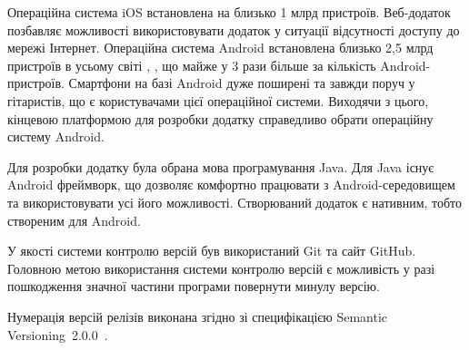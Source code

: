 Операційна система iOS встановлена на близько 1 млрд пристроїв. Веб-додаток позбавляє можливості використовувати додаток у ситуації відсутності доступу до мережі Інтернет. Операційна система Android встановлена близько 2,5 млрд пристроїв в усьому світі \cite{androiddevelopers}, , що майже у 3 рази більше за кількість Android-пристроїв. Смартфони на базі Android дуже поширені та завжди поруч у гітаристів, що є користувачами цієї операційної системи. Виходячи з цього, кінцевою платформою для розробки додатку справедливо обрати операційну систему Android.

Для розробки додатку була обрана мова програмування Java. Для Java існує Android фреймворк, що дозволяє комфортно працювати з Android-середовищем та використовувати усі його можливості. Створюваний додаток є нативним, тобто створеним для Android. 

У якості системи контролю версій був використаний Git та сайт GitHub. Головною метою використання системи контролю версій є можливість у разі пошкодження значної частини програми повернути минулу версію.

Нумерація версій релізів виконана згідно зі специфікацією Semantic Versioning~2.0.0~\cite{semver}.